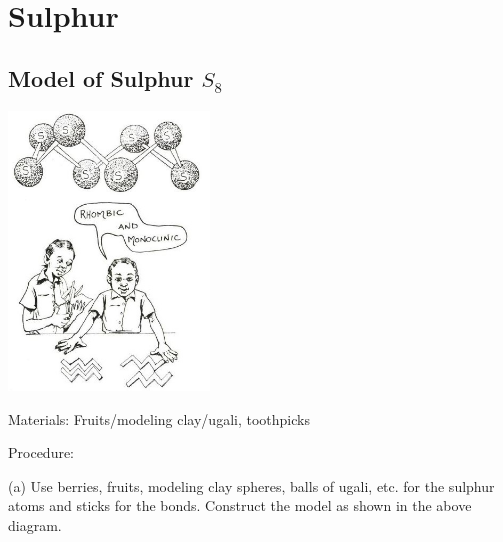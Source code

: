 \begin{multicols}{2}
\begin{description*}
{\\
}
\end{description*}


\section*{Sulphur}


\subsection{Model of Sulphur $S_8$}

\begin{center}
\includegraphics[width=0.4\textwidth]{./img/source/sulphur-model.jpg}
\end{center}

\begin{description*}
\item[Materials:]{Fruits/modeling clay/ugali, toothpicks}
\item[Procedure:]{(a) Use berries, fruits, modeling
clay spheres, balls of ugali, etc. for the sulphur atoms and
sticks for the bonds. Construct the model as
shown in the above diagram.

}
\end{description*}
\end{multicols}

